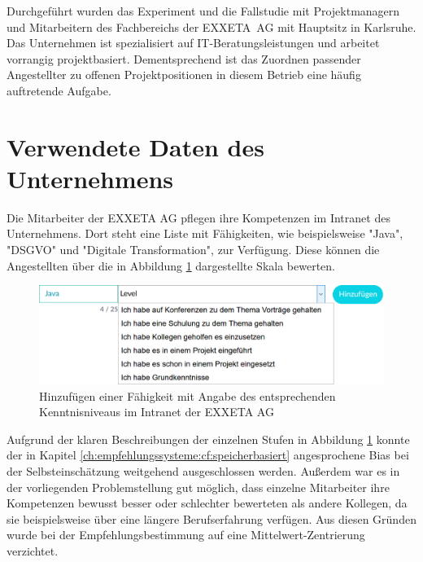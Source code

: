Durchgeführt wurden das Experiment und die Fallstudie mit Projektmanagern und Mitarbeitern des Fachbereichs \JES der \mbox{EXXETA AG} mit Hauptsitz in Karlsruhe. Das Unternehmen ist spezialisiert auf IT-Beratungsleistungen und arbeitet vorrangig projektbasiert. Dementsprechend ist das Zuordnen passender Angestellter zu offenen Projektpositionen in diesem Betrieb eine häufig auftretende Aufgabe.

\section{Verwendete Daten des Unternehmens}
\label{ch:methodik:versuchsaufbau}
Die Mitarbeiter der EXXETA AG pflegen ihre Kompetenzen im Intranet des Unternehmens. Dort steht eine Liste mit \anzFaehigkeiten Fähigkeiten, wie beispielsweise "Java", "DSGVO" und "Digitale Transformation", zur Verfügung. Diese können die Angestellten über die in Abbildung \ref{fig:methodik:versuchsaufbau:daten:abb1} dargestellte Skala bewerten.

\begin{figure}[h]
	\centering
	\includegraphics[width=1\textwidth]{gfx/skill-level.png}
	\caption{Hinzufügen einer Fähigkeit mit Angabe des entsprechenden Kenntnisniveaus im Intranet der EXXETA AG}
	\label{fig:methodik:versuchsaufbau:daten:abb1}
\end{figure}

Aufgrund der klaren Beschreibungen der einzelnen Stufen in Abbildung \ref{fig:methodik:versuchsaufbau:daten:abb1} konnte der in Kapitel \ref{ch:empfehlungssysteme:cf:speicherbasiert} angesprochene Bias bei der Selbsteinschätzung weitgehend ausgeschlossen werden. Außerdem war es in der vorliegenden Problemstellung gut möglich, dass einzelne Mitarbeiter ihre Kompetenzen bewusst besser oder schlechter bewerteten als andere Kollegen, da sie beispielsweise über eine längere Berufserfahrung verfügen. Aus diesen Gründen wurde bei der Empfehlungsbestimmung auf eine Mittelwert-Zentrierung verzichtet.


